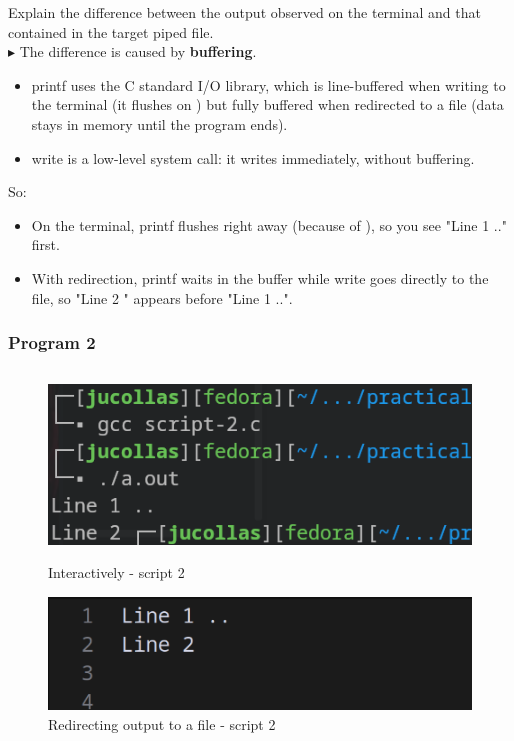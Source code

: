 \documentclass[12pt]{article}
\begin{document}
Explain the difference between the output observed on the terminal and that contained in the target piped file. \\
$\blacktriangleright$ 
The difference is caused by \textbf{buffering}.
\begin{itemize}
    \item  printf uses the C standard I/O library, which is line-buffered when writing to the terminal (it flushes on \n) but fully buffered when redirected to a file (data stays in memory until the program ends).
    \item write is a low-level system call: it writes immediately, without buffering.
\end{itemize}

So:
\begin{itemize}
    \item On the terminal, printf flushes right away (because of \n), so you see "Line 1 .." first.
    \item With redirection, printf waits in the buffer while write goes directly to the file, so "Line 2 " appears before "Line 1 ..".
\end{itemize}

\newpage

\subsubsection*{Program 2}

\inputminted{cpp}{scripts/script-2.c}

\begin{figure}[h]
    \centering
    \begin{minipage}{0.45\textwidth}
        \centering
        \includegraphics[width=\linewidth]{images/interactive-script2.png}
        \caption{Interactively - script 2}
    \end{minipage}
    \hfill %
    \begin{minipage}{0.45\textwidth}
        \centering
        \includegraphics[width=\linewidth]{images/outfile-script2.png}
        \caption{Redirecting output to a file - script 2}
    \end{minipage}
\end{figure}
\end{document}
